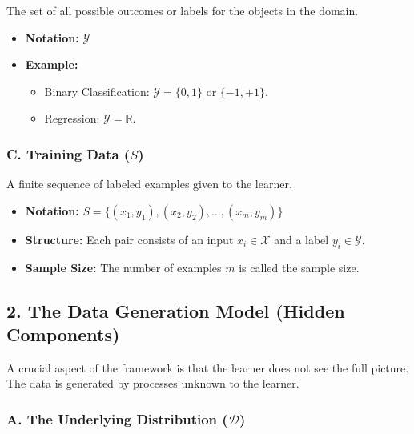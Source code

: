 \documentclass[
  italian,
  11pt,
]{article}
\providecommand{\tightlist}{%
  \setlength{\itemsep}{0pt}\setlength{\parskip}{0pt}}
\begin{document}
The set of all possible outcomes or labels for the objects in the
domain.

\begin{itemize}
\tightlist
\item
  \textbf{Notation:} \(\mathcal{Y}\)
\item
  \textbf{Example:}

  \begin{itemize}
  \tightlist
  \item
    Binary Classification: \(\mathcal{Y} = \{0, 1\}\) or \(\{-1, +1\}\).
  \item
    Regression: \(\mathcal{Y} = \mathbb{R}\).
  \end{itemize}
\end{itemize}

\subsubsection{\texorpdfstring{C. Training Data
(\(S\))}{C. Training Data (S)}}\label{c.-training-data-s}

A finite sequence of labeled examples given to the learner.

\begin{itemize}
\tightlist
\item
  \textbf{Notation:}
  \(S = \{(x_1, y_1), (x_2, y_2), \dots, (x_m, y_m)\}\)
\item
  \textbf{Structure:} Each pair consists of an input
  \(x_i \in \mathcal{X}\) and a label \(y_i \in \mathcal{Y}\).
\item
  \textbf{Sample Size:} The number of examples \(m\) is called the
  sample size.
\end{itemize}

\subsection{2. The Data Generation Model (Hidden
Components)}\label{the-data-generation-model-hidden-components}

A crucial aspect of the framework is that the learner does not see the
full picture. The data is generated by processes unknown to the learner.

\subsubsection{\texorpdfstring{A. The Underlying Distribution
(\(\mathcal{D}\))}{A. The Underlying Distribution (\textbackslash mathcal\{D\})}}\label{a.-the-underlying-distribution-mathcald}
\end{document}
